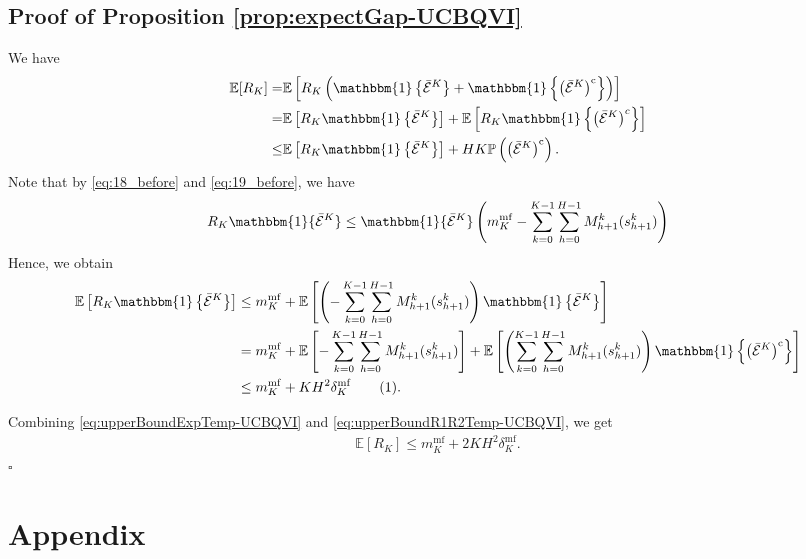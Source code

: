\documentclass[11pt]{article}
\newcommand{\E} {\mathbb{E}}
\newcommand{\PP}{\mathbb{P}}
\newcommand{\Dvsm}{M}
\newcommand\numberthis{\addtocounter{equation}{1}\tag{\theequation}}
\begin{document}
\subsection{Proof of Proposition \ref{prop:expectGap-UCBQVI}}
    We have
    \begin{align}
        \E[R_K] = & \E\left[R_K  \left(\mathbbm{1}\left\{\bar{\mathcal{E}}^K\right\} + \mathbbm{1}\left\{\left(\bar{\mathcal{E}}^K\right)^\mathrm{c}\right\}\right)\right] \nonumber\\
        = & \E \left[R_K \mathbbm{1}\left\{\bar{\mathcal{E}}^K\right\}\right] + \E\left[R_K \mathbbm{1}\left\{\left(\bar{\mathcal{E}}^K\right)^c\right\}\right] \nonumber\\
        \leq & \E \left[R_K \mathbbm{1}\left\{\bar{\mathcal{E}}^K\right\}\right] + HK\PP\left(\left(\bar{\mathcal{E}}^K\right)^\mathrm{c}\right).\label{eq:upperBoundExpTemp-UCBQVI}
    \end{align}
    Note that by \eqref{eq:18_before} and \eqref{eq:19_before}, we have
    \begin{align*}  
    R_K \mathbbm{1}\{\bar{\mathcal{E}}^K\} \leq   \mathbbm{1}\{\bar{\mathcal{E}}^K\}\left(m_K^{\mathrm{mf}} - \sum_{k=0}^{K-1}\sum_{h=0}^{H-1} \Dvsm^k_{h+1}(s_{h+1}^k) \right)
    \end{align*}
    Hence, we obtain
    \begin{align*}
        \E \left[R_K \mathbbm{1}\left\{\bar{\mathcal{E}}^K\right\}\right] 
        &\leq m_K^{\mathrm{mf}} + \E\left[\left( - \sum_{k=0}^{K-1}\sum_{h=0}^{H-1} \Dvsm^k_{h+1}(s_{h+1}^k)\right) \mathbbm{1}\left\{\bar{\mathcal{E}}^K\right\}\right]\\
        &=m_K^{\mathrm{mf}} + \E\left[ - \sum_{k=0}^{K-1}\sum_{h=0}^{H-1} \Dvsm^k_{h+1}(s_{h+1}^k)\right] + \E\left[\left( \sum_{k=0}^{K-1}\sum_{h=0}^{H-1} \Dvsm^k_{h+1}(s_{h+1}^k)\right) \mathbbm{1}\left\{\left(\bar{\mathcal{E}}^K\right)^{\mathrm{c}}\right\}\right]\\
        &\leq m_K^{\mathrm{mf}} + KH^2\delta_K^{\mathrm{mf}}\numberthis\label{eq:upperBoundR1R2Temp-UCBQVI}.
    \end{align*}

    Combining \eqref{eq:upperBoundExpTemp-UCBQVI} and \eqref{eq:upperBoundR1R2Temp-UCBQVI}, we get
    \begin{align*}
        \E[R_K]\leq   m_K^{\mathrm{mf}} + 2 KH^2\delta_K^{\mathrm{mf}}.
    \end{align*}\hfill$\square$

\newpage
\appendix
\section*{Appendix}
\end{document}
